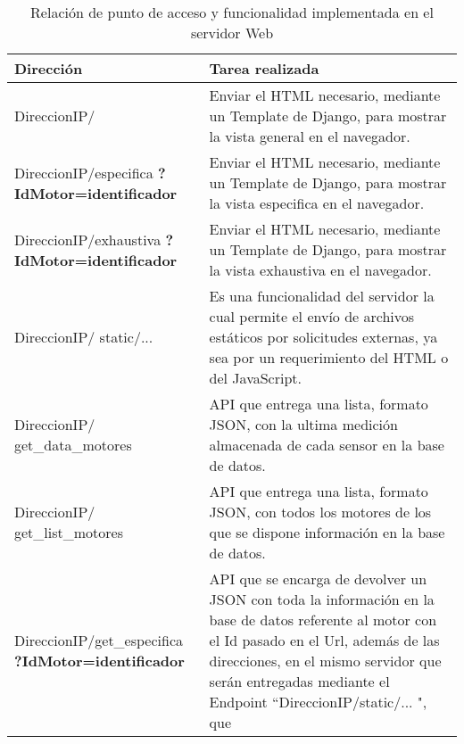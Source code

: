     \begin{table}[H]
        \begin{center}
        \caption[Funciones Servidor Web]{ Relación de punto de acceso y
        funcionalidad implementada en el servidor Web }
        \label{tab:serWeb}

            \vspace{0.3cm}
            \begin{tabular}{|p{5cm}|p{10cm}|}
                \hline
                Dirección       & Tarea realizada
                \\\hline\hline
                DireccionIP/ &
                Enviar el HTML necesario, mediante un Template de Django,
                para mostrar la vista general en el navegador.
                \\\hline
                DireccionIP/especifica \textbf{?IdMotor=identificador}&
                Enviar el HTML necesario, mediante un Template de Django,
                para mostrar la vista especifica en el navegador.
                \\\hline
                DireccionIP/exhaustiva \textbf{?IdMotor=identificador}  &
                Enviar el HTML necesario, mediante un Template de Django,
                para mostrar la vista exhaustiva en el navegador.
                \\\hline
                DireccionIP/ static/... &
                Es una funcionalidad del servidor la cual permite el envío de
                archivos estáticos por solicitudes externas, ya sea por un
                requerimiento del HTML o del JavaScript.
                \\\hline
                DireccionIP/ get\_data\_motores &
                API que entrega  una lista, formato JSON,
                con la ultima medición almacenada de cada sensor en la base de
                datos.
                \\\hline
                DireccionIP/ get\_list\_motores &
                API que entrega una lista, formato JSON,
                con todos los motores de los que se
                dispone información en la base de datos.
                \\\hline
                DireccionIP/get\_especifica \textbf{?IdMotor=identificador}&
                API que se encarga de devolver un JSON con toda la información
                en la base de datos referente al motor con el Id pasado en el
                Url, además de las direcciones, en el mismo servidor que serán
                entregadas mediante el Endpoint ``DireccionIP/static/... ", que

\end{tabular}
\end{center}
\end{table}
